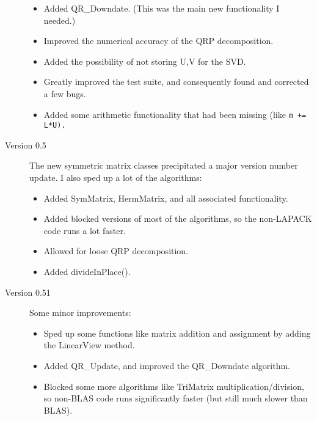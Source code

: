 \begin{description}
\begin{itemize}

\item
Added QR\_Downdate.  (This was the main new functionality I needed.)

\item
Improved the numerical accuracy of the QRP decomposition.

\item
Added the possibility of not storing U,V for the SVD.

\item
Greatly improved the test suite, and consequently found and corrected a few bugs.

\item
Added some arithmetic functionality that had been missing (like \tt{m += L*U}).

\end{itemize}

\item[Version 0.5]
The new symmetric matrix classes precipitated a major version number update.
I also sped up a lot of the algorithms:

\begin{itemize}

\item
Added SymMatrix, HermMatrix, and all associated functionality.

\item
Added blocked versions of most of the algorithms, so the non-LAPACK
code runs a lot faster.

\item
Allowed for loose QRP decomposition.

\item
Added divideInPlace().

\end{itemize}

\item[Version 0.51]
Some minor improvements:

\begin{itemize}

\item
Sped up some functions like matrix addition and assignment by adding the 
LinearView method.

\item
Added QR\_Update, and improved the QR\_Downdate algorithm.

\item
Blocked some more algorithms like TriMatrix multiplication/division, so non-BLAS
code runs significantly faster (but still much slower than BLAS).


\end{itemize}
\end{description}
